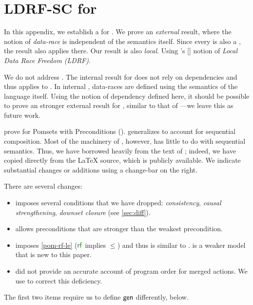 \section{LDRF-SC for \PwTmcaTITLE{}}
\label{sec:sc}

\begin{changed}
  In this appendix, we establish a \drfsc{} for .  We prove an
  \emph{external} result, where the notion of \emph{data-race} is independent
  of the semantics itself.  Since every  is also a , the
  result also applies there.  Our result is also \emph{local}.  Using
  \citeauthor{Dolan:2018:BDR:3192366.3192421}'s
  [\citeyear{Dolan:2018:BDR:3192366.3192421}] notion of \emph{Local Data Race
    Freedom (LDRF)}.

  We do not address \PwTc{}.  The internal \drfsc{} result for \cXI{}
  \cite{DBLP:phd/ethos/Batty15} does not rely on dependencies and thus
  applies to \PwTc{}.  In internal \drfsc{}, data-races are defined using the
  semantics of the language itself.  Using the notion of dependency defined
  here, it should be possible to prove an stronger external result for
  \cXI{}, similar to that of \cite{DBLP:conf/pldi/LahavVKHD17}---we leave
  this as future work.

  \citet{DBLP:journals/pacmpl/JagadeesanJR20} prove \ldrfsc{} for Pomsets
  with Preconditions (\PwP{}).  \PwTmca{} generalizes \PwP{} to account for
  sequential composition.  Most of the machinery of \ldrfsc{}, however, has
  little to do with sequential semantics.  Thus, we have borrowed heavily
  from the text of \cite{DBLP:journals/pacmpl/JagadeesanJR20}; indeed, we
  have copied directly from the \LaTeX{} source, which is publicly available.
  We indicate substantial changes or additions using a change-bar on the
  right.

  There are several changes:
  \begin{itemize}
  \item \PwP{} imposes several conditions that we have dropped:
    \emph{consistency}, \emph{causal strengthening}, \emph{downset closure}
    (see \textsection\ref{sec:diff}).
  \item \PwP{} allows preconditions that are stronger than the weakest precondition.
  \item \PwP{} imposes \ref{pom-rf-le} ($\rrfx$ implies $\le$) and thus is
    similar to .   is a weaker model that is new to this
    paper.  %
  \item \PwP{} did not provide an accurate account of program order for
    merged actions.  We use  to correct this deficiency.
  \end{itemize}
  The first two items require us to define $\semmin{}$ differently, below.
\end{changed}

